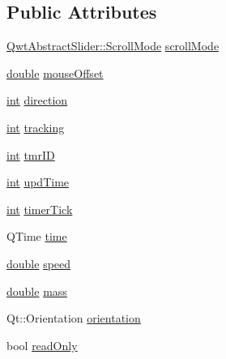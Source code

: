 \subsection*{Public Attributes}
\begin{DoxyCompactItemize}
\item 
\hyperlink{class_qwt_abstract_slider_ae4c0c4844ac6a35356f3c529a8eae154}{Qwt\-Abstract\-Slider\-::\-Scroll\-Mode} \hyperlink{class_qwt_abstract_slider_1_1_private_data_acdffef38a15bf408e196637ad5a747a2}{scroll\-Mode}
\item 
\hyperlink{_super_l_u_support_8h_a8956b2b9f49bf918deed98379d159ca7}{double} \hyperlink{class_qwt_abstract_slider_1_1_private_data_a494ad246617972ec0194ad0fb2001cb8}{mouse\-Offset}
\item 
\hyperlink{ioapi_8h_a787fa3cf048117ba7123753c1e74fcd6}{int} \hyperlink{class_qwt_abstract_slider_1_1_private_data_acd4bce38693eabce708b029223394d01}{direction}
\item 
\hyperlink{ioapi_8h_a787fa3cf048117ba7123753c1e74fcd6}{int} \hyperlink{class_qwt_abstract_slider_1_1_private_data_a5beb5e80a6a60359b5bf2ecf8544a50f}{tracking}
\item 
\hyperlink{ioapi_8h_a787fa3cf048117ba7123753c1e74fcd6}{int} \hyperlink{class_qwt_abstract_slider_1_1_private_data_a477512995bbd0c3849108098caf367ab}{tmr\-I\-D}
\item 
\hyperlink{ioapi_8h_a787fa3cf048117ba7123753c1e74fcd6}{int} \hyperlink{class_qwt_abstract_slider_1_1_private_data_a6c0f65380033052f9da6bbcecbe81a83}{upd\-Time}
\item 
\hyperlink{ioapi_8h_a787fa3cf048117ba7123753c1e74fcd6}{int} \hyperlink{class_qwt_abstract_slider_1_1_private_data_a5a6e0f585aaea765b4afcfb5cb0e17c8}{timer\-Tick}
\item 
Q\-Time \hyperlink{class_qwt_abstract_slider_1_1_private_data_a04e6a5c3c393d9ef708bb773773a3acd}{time}
\item 
\hyperlink{_super_l_u_support_8h_a8956b2b9f49bf918deed98379d159ca7}{double} \hyperlink{class_qwt_abstract_slider_1_1_private_data_a7fa542ccd948456ac52aead4ddfefd89}{speed}
\item 
\hyperlink{_super_l_u_support_8h_a8956b2b9f49bf918deed98379d159ca7}{double} \hyperlink{class_qwt_abstract_slider_1_1_private_data_a8c835192d3166a471b3837c7db9738e1}{mass}
\item 
Qt\-::\-Orientation \hyperlink{class_qwt_abstract_slider_1_1_private_data_abb9d547864f942e5183f551baf93b520}{orientation}
\item 
bool \hyperlink{class_qwt_abstract_slider_1_1_private_data_abfa5dba9ceb2a353f2211ac60f80dbb7}{read\-Only}
\end{DoxyCompactItemize}


